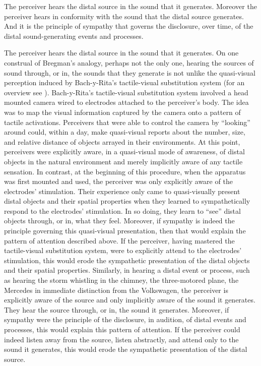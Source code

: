 The perceiver hears the distal source in the sound that it generates. Moreover the perceiver hears in conformity with the sound that the distal source generates. And it is the principle of sympathy that governs the disclosure, over time, of the distal sound-generating events and processes.

The perceiver hears the distal source in the sound that it generates. On one construal of Bregman's analogy, perhaps not the only one, hearing the sources of sound through, or in, the sounds that they generate is not unlike the quasi-visual perception induced by Bach-y-Rita's tactile-visual substitution system (for an overview see \citealt{Bach-y-Rita:2002jk}). Bach-y-Rita's tactile-visual substitution system involved a head mounted camera wired to electrodes attached to the perceiver's body. The idea was to map the visual information captured by the camera onto a pattern of tactile activations. Perceivers that were able to control the camera by ``looking'' around could, within a day, make quasi-visual reports about the number, size, and relative distance of objects arrayed in their environments. At this point, perceivers were explicitly aware, in a quasi-visual mode of awareness, of distal objects in the natural environment and merely implicitly aware of any tactile sensation. In contrast, at the beginning of this procedure, when the apparatus was first mounted and used, the perceiver was only explicitly aware of the electrodes' stimulation. Their experience only came to quasi-visually present distal objects and their spatial properties when they learned to sympathetically respond to the electrodes' stimulation. In so doing, they learn to ``see'' distal objects through, or in, what they feel. Moreover, if sympathy is indeed the principle governing this quasi-visual presentation, then that would explain the pattern of attention described above. If the perceiver, having mastered the tactile-visual substitution system, were to explicitly attend to the electrodes' stimulation, this would erode the sympathetic presentation of the distal objects and their spatial properties. Similarly, in hearing a distal event or process, such as hearing the storm whistling in the chimney, the three-motored plane, the Mercedes in immediate distinction from the Volkswagen, the perceiver is explicitly aware of the source and only implicitly aware of the sound it generates. They hear the source through, or in, the sound it generates. Moreover, if sympathy were the principle of the disclosure, in audition, of distal events and processes, this would explain this pattern of attention. If the perceiver could indeed listen away from the source, listen abstractly, and attend only to the sound it generates, this would erode the sympathetic presentation of the distal source. 

